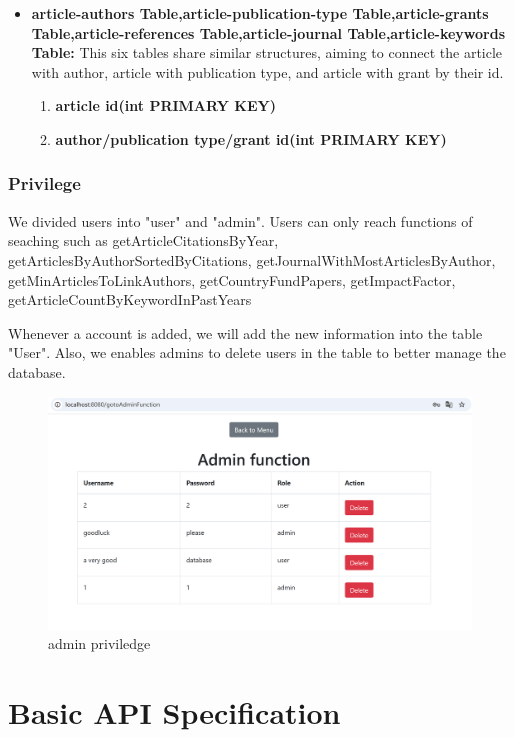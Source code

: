 \documentclass{article}
\begin{document}
\begin{itemize}
\item \textbf{article-authors Table,article-publication-type Table,article-grants Table,article-references Table,article-journal Table,article-keywords Table:} This six tables share similar structures, aiming to connect the article with author, article with publication type, and article with grant by their id.
\begin{enumerate}
\item \textbf{article id(int PRIMARY KEY)}
\item \textbf{author/publication type/grant id(int PRIMARY KEY)}
\end{enumerate}

\end{itemize}
\subsubsection{Privilege}
We divided users into "user" and "admin". Users can only reach functions of seaching such as getArticleCitationsByYear, getArticlesByAuthorSortedByCitations, getJournalWithMostArticlesByAuthor, getMinArticlesToLinkAuthors, getCountryFundPapers, getImpactFactor, getArticleCountByKeywordInPastYears

Whenever a account is added, we will add the new information into the table "User". Also, we enables admins to delete users in the table to better manage the database.
\begin{figure}[h]
\centering %
\includegraphics[width=.8\textwidth]{权限.png} %
\caption{admin priviledge} %
\label{fig:引用标签} %
\end{figure}

\section{Basic API Specification}
\end{document}

